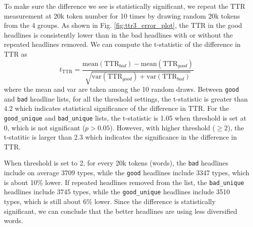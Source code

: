 \documentclass[%
preprint,
 amsmath,amssymb,
 aps,
]{revtex4-2}
\begin{document}
To make sure the difference we see is statistically significant, we repeat the TTR measurement at 20k token number for 10 times by drawing random 20k tokens from the 4 groups. As shown in Fig. \ref{fig:ttr3_error_plot}, the TTR in the good headlines is consistently lower than in the bad headlines with or without the repeated headlines removed.
We can compute the t-statistic of the difference in TTR as
\begin{equation}
    t_{\mathrm{TTR}} = \frac{\mathrm{mean}(\mathrm{TTR}_{bad}) - \mathrm{mean}(\mathrm{TTR}_{good})}{\sqrt{\mathrm{var}(\mathrm{TTR}_{good}) + \mathrm{var}(\mathrm{TTR}_{bad})}}
\end{equation}
where the mean and var are taken among the 10 random draws.
Between \texttt{good} and \texttt{bad} headline lists, for all the threshold settings, the t-statistic is greater than 4.2 which indicates statistical significance of the difference in TTR.
For the \texttt{good\_unique} and \texttt{bad\_unique} lists, the t-statistic is 1.05 when threshold is set at 0, which is not significant (\(p > 0.05\)).
However, with higher threshold (\(\geq 2\)), the t-statitic is larger than 2.3 which indicates the significance in the difference in TTR.

When threshold is set to 2, for every 20k tokens (words), the \texttt{bad} headlines include on average 3709 types, while the \texttt{good} headlines include 3347 types, which is about 10\% lower.
If repeated headlines removed from the list, the \texttt{bad\_unique} headlines include 3745 types, while the \texttt{good\_unique} headlines include 3510 types, which is still about 6\% lower.
Since the difference is statistically significant, we can conclude that the better headlines are using less diversified words.
\end{document}
